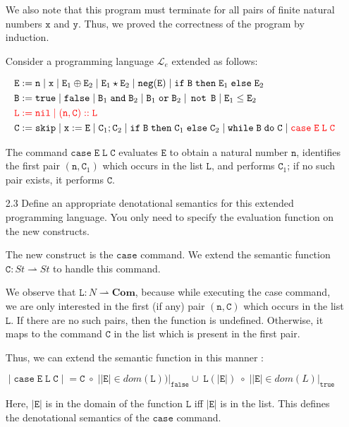 \documentclass[a4paper,10pt]{article}
\newcommand{\E}{\mathtt{E}}
\newcommand{\B}{\mathtt{B}}
\newcommand{\C}{\mathtt{C}}
\newcommand{\LL}{\mathtt{L}}
\newcommand{\true}{\mathtt{true}}
\newcommand{\false}{\mathtt{false}}
\newcommand{\andsym}{\mathtt{and}}
\newcommand{\orsym}{\mathtt{or}}
\newcommand{\notsym}{\mathop{\mathtt{not}}}
\newcommand{\ifsym}{\mathtt{if}}
\newcommand{\then}{\mathtt{then}}
\newcommand{\elsesym}{\mathtt{else}}
\newcommand{\whilesym}{\mathtt{while}}
\newcommand{\dosym}{\mathtt{do}}
\newcommand{\skipsym}{\mathtt{skip}}
\newcommand{\nil}{\mathtt{nil}}
\newcommand{\case}{\mathtt{case}}
\newcommand{\negation}{\mathtt{neg}}
\newcommand{\question}[1]
{\color{DarkBlue}#1 \color{Black} \newline}
\begin{document}
\begin{enumerate}
We also note that this program must terminate for all pairs of finite natural
numbers $\mathtt{x}$ and $\mathtt{y}$. Thus, we proved the correctness of the 
program by induction.

\question{
Consider a programming language $\mathcal{L}_e$ extended as follows:

\begin{align*}
& \E := \mathtt{n} \; | \; \mathtt{x} \; | \; \E_1 \oplus \E_2 \; | \; \E_1 \star \E_2 \; | \; \negation(\E) \; | \; \ifsym \; \B \; \then \; \E_1 \; \elsesym \; \E_2 \\
& \B := \true \; | \; \false \; | \; \B_1 \; \andsym \; \B_2 \; | \; \B_1 \; \orsym \; \B_2 \; | \; \notsym \; \B \; | \; \E_1 \leq \E_2 \\
& {\color{red} \LL := \nil \; | \; (\mathtt{n},\C)::\LL} \\
& \C := \skipsym \; | \; \mathtt{x} := \E \; | \; \C_1 ; \C_2 \; | \; \ifsym \; \B \; \then \; \C_1 \; \elsesym \; \C_2 \; | \; \whilesym \; \B \; \dosym \; \C \; | \; {\color{red} \case \; \E \; \LL \; \C}
\end{align*}

The command $\case \; \E \; \LL \; \C$ evaluates $\E$ to obtain a natural number $\mathtt{n}$,
identifies the first pair $(\mathtt{n},\C_1)$ which occurs in the list $\LL$, and performs $\C_1$;
if no such pair exists, it performs $\C$.
}

\question{
\item[2.3] Define an appropriate denotational semantics for this extended programming language. 
You only need to specify the evaluation function on the new constructs.
}

The new construct is the $\case$ command. We extend the
semantic function $\C : St \rightharpoonup St$ to handle this command.

We observe that $\LL : N \rightharpoonup \textbf{Com} $, because while executing
the case command, we are only interested in the first (if any) pair  $(\mathtt{n},\C)$
which occurs in the list $\LL$. If there are no such pairs, then the function is
undefined. Otherwise, it maps to the command $\C$ in the list which is present
in the first pair.

Thus, we can extend the semantic function in this manner :

$\; | \; \case \; \E \; \LL \; \C \; |\; = 
\C \; \circ \; | |\E| \in dom(\LL) ) |_{\false} \cup \; 
\LL(|\E|) \; \circ \; | |\E| \in dom(L) |_{\true} $

Here, $|\E|$ is in the domain of the function $\LL$ iff $|\E|$ is in the
list. This defines the denotational semantics of the $\case$ command.


\end{enumerate}
\end{document}

